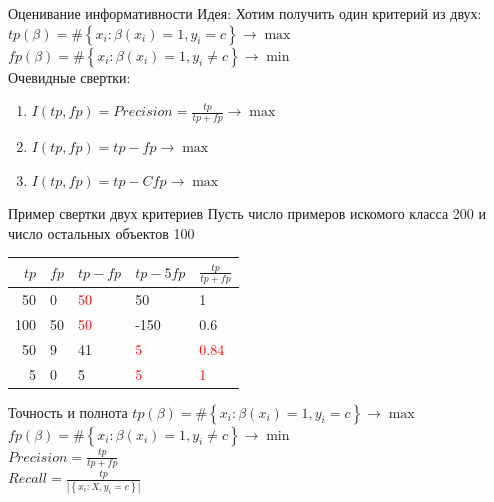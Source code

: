 \documentclass[10pt]{beamer}
\begin{document}
\begin{frame}{Оценивание информативности}
	\alert{Идея}: Хотим получить один критерий из двух:\\
	\bigbreak
	${ tp(\beta) = \# \left\{ x_i: \beta(x_i) = 1 , y_i = c \right\} \rightarrow \max  }$ 
	${ fp(\beta) = \# \left\{ x_i: \beta(x_i) = 1 , y_i \neq c \right\} \rightarrow \min}$ \\
	\bigbreak
	\pause
	Очевидные свертки:\\
	\begin{enumerate}
		\item $I(tp, fp) = Precision = \frac{tp}{tp+fp} \rightarrow \max$
		\item $I(tp, fp) = tp-fp \rightarrow \max$
		\item $I(tp, fp) = tp-Cfp \rightarrow \max$			
	\end{enumerate}
\end{frame}

\begin{frame}{Пример свертки двух критериев}
	Пусть число примеров искомого класса 200 и число остальных объектов 100\\
	\bigbreak
	\begin{tabular}{|r l|l|l|l|}
	  \hline 
	  $tp$ & $fp$ & $tp-fp$ & $tp-5fp$ & $\frac{tp}{tp+fp}$\\ 
	  \hline \hline
	  50 & 0 & \textcolor{red}{50} & 50 & 1\\
	  \hline
	  100 & 50 & \textcolor{red}{50} & -150 & 0.6\\
	  \hline \hline
	  50 & 9 & 41 & \textcolor{red}{5} & \textcolor{red}{0.84}\\
	  \hline  
	  5 & 0 & 5 & \textcolor{red}{5} & \textcolor{red}{1}\\  
	  \hline 
	\end{tabular}
\end{frame}

\begin{frame}{Точность и полнота}
	${ tp(\beta) = \# \left\{ x_i: \beta(x_i) = 1 , y_i = c \right\} \rightarrow \max  }$ 
	${ fp(\beta) = \# \left\{ x_i: \beta(x_i) = 1 , y_i \neq c \right\} \rightarrow \min}$ \\
	\bigbreak
	\pause
	$Precision = \frac{tp}{tp+fp}$\\
	\bigbreak
	$Recall = \frac{tp}{|\left\{ x_i: X , y_i = c \right\}|}$
\end{frame}
\end{document}
